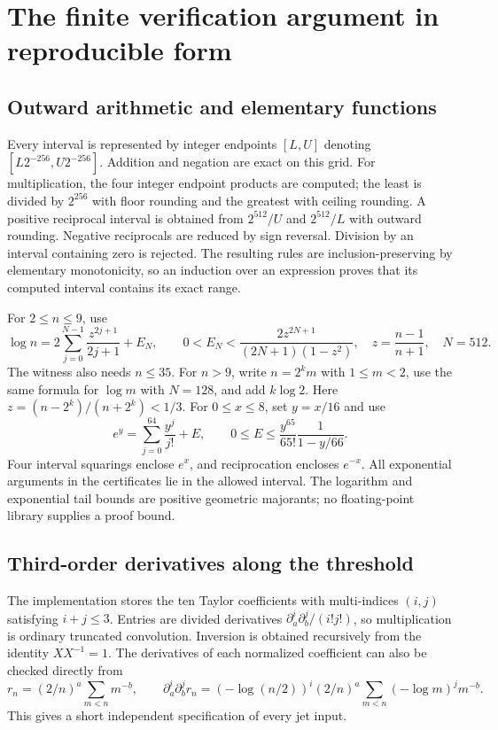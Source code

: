 \appendix
\section{The finite verification argument in reproducible form}
\label{rbif:app:verification}
\subsection{Outward arithmetic and elementary functions}
Every interval is represented by integer endpoints $[L,U]$ denoting
$[L2^{-256},U2^{-256}]$. Addition and negation are exact on this grid.
For multiplication, the four integer endpoint products are computed;
the least is divided by $2^{256}$ with floor rounding and the greatest
with ceiling rounding. A positive reciprocal interval is obtained from
$2^{512}/U$ and $2^{512}/L$ with outward rounding. Negative reciprocals
are reduced by sign reversal. Division by an interval containing zero
is rejected. The resulting rules are inclusion-preserving by elementary
monotonicity, so an induction over an expression proves that its
computed interval contains its exact range.

For $2\le n\le9$, use
\begin{equation}
 \log n=2\sum_{j=0}^{N-1}\frac{z^{2j+1}}{2j+1}+E_N,\qquad
 0<E_N<\frac{2z^{2N+1}}{(2N+1)(1-z^2)},\quad
 z=\frac{n-1}{n+1},\quad N=512.
 \label{rbif:eq:logtail}
\end{equation}
The witness also needs $n\le35$. For $n>9$, write $n=2^km$ with
$1\le m<2$, use the same formula for $\log m$ with $N=128$, and add
$k\log2$. Here $z=(n-2^k)/(n+2^k)<1/3$.
For $0\le x\le8$, set $y=x/16$ and use
\begin{equation}
 e^y=\sum_{j=0}^{64}\frac{y^j}{j!}+E,\qquad
 0\le E\le\frac{y^{65}}{65!}\frac1{1-y/66}.
 \label{rbif:eq:exptail}
\end{equation}
Four interval squarings enclose $e^x$, and reciprocation encloses
$e^{-x}$. All exponential arguments in the certificates lie in the
allowed interval. The logarithm and exponential tail bounds are positive
geometric majorants; no floating-point library supplies a proof bound.

\subsection{Third-order derivatives along the threshold}
The implementation stores the ten Taylor coefficients with multi-indices
$(i,j)$ satisfying $i+j\le3$. Entries are divided derivatives
$\partial_a^i\partial_b^j/(i!j!)$, so multiplication is ordinary truncated
convolution. Inversion is obtained recursively from the identity
$XX^{-1}=1$. The derivatives of each normalized coefficient can also
be checked directly from
\[
 r_n=(2/n)^a\sum_{m<n}m^{-b},\qquad
 \partial_a^i\partial_b^j r_n
 =(-\log(n/2))^i(2/n)^a\sum_{m<n}(-\log m)^j m^{-b}.
\]
This gives a short independent specification of every jet input.

